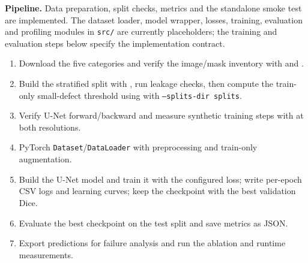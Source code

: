 \documentclass[11pt,a4paper]{article}
\begin{document}
\textbf{Pipeline.}
Data preparation, split checks, metrics and the standalone smoke test are implemented. The dataset loader, model wrapper, losses, training, evaluation and profiling modules in \texttt{src/} are currently placeholders; the training and evaluation steps below specify the implementation contract.
\begin{enumerate}
  \item Download the five categories and verify the image/mask inventory with  and .
  \item Build the stratified split with , run leakage checks, then compute the train-only small-defect threshold using  with \texttt{--splits-dir splits}.
  \item Verify U-Net forward/backward and measure synthetic training steps with  at both resolutions.
  \item PyTorch \texttt{Dataset}/\allowbreak\texttt{DataLoader} with preprocessing and train-only augmentation.
  \item Build the U-Net model and train it with the configured loss; write per-epoch CSV logs and learning curves; keep the checkpoint with the best validation Dice.
  \item Evaluate the best checkpoint on the test split and save metrics as JSON.
  \item Export predictions for failure analysis and run the ablation and runtime measurements.
\end{enumerate}
\end{document}
